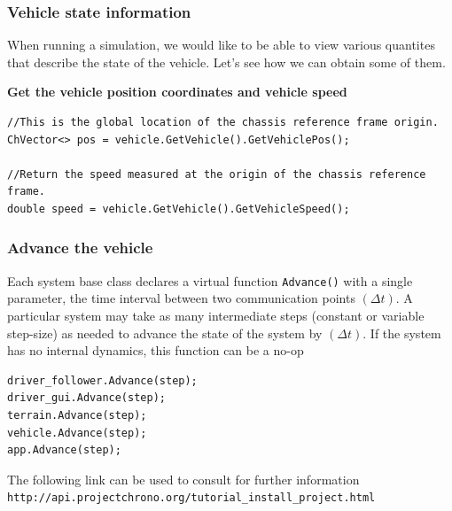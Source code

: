 \subsubsection{Vehicle state information}

When running a simulation, we would like to be able to view various quantites that describe the state of the vehicle. Let's see how
we can obtain some of them.

\textbf{Get the vehicle position coordinates and vehicle speed}

\begin{lstlisting}
//This is the global location of the chassis reference frame origin. 
ChVector<> pos = vehicle.GetVehicle().GetVehiclePos();

//Return the speed measured at the origin of the chassis reference frame.
double speed = vehicle.GetVehicle().GetVehicleSpeed();
\end{lstlisting}


\subsubsection{Advance the vehicle}

Each system base class declares a virtual function \lstinline{Advance()}
with a single parameter, the time interval between two communication points $(\Delta t)$.
A particular system may take as many intermediate steps (constant or variable step-size) 
as needed to advance the state of the system by $(\Delta t)$.  If the system has no internal dynamics, this function can be a no-op

\begin{lstlisting}
driver_follower.Advance(step);
driver_gui.Advance(step);
terrain.Advance(step);
vehicle.Advance(step);
app.Advance(step);
\end{lstlisting}



The following link can be used to consult for further information \lstinline{http://api.projectchrono.org/tutorial_install_project.html}












